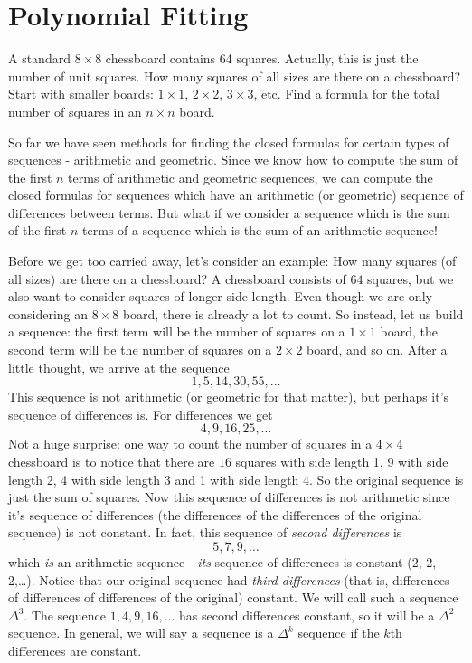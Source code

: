 \documentclass[12pt]{article}
\begin{document}
\section{Polynomial Fitting}

\begin{activity}
A standard $8 \times 8$ chessboard contains 64 squares.  Actually, this is just the number of unit squares.  How many squares of all sizes are there on a chessboard?  Start with smaller boards: $1\times 1$, $2 \times 2$, $3\times 3$, etc.  Find a formula for the total number of squares in an $n\times n$ board.
\end{activity}

So far we have seen methods for finding the closed formulas for certain types of sequences - arithmetic and geometric.  Since we know how to compute the sum of the first $n$ terms of arithmetic and geometric sequences, we can compute the closed formulas for sequences which have an arithmetic (or geometric) sequence of differences between terms.  But what if we consider a sequence which is the sum of the first $n$ terms of a sequence which is the sum of an arithmetic sequence!

Before we get too carried away, let's consider an example: How many squares (of all sizes) are there on a chessboard?  A chessboard consists of $64$ squares, but we also want to consider squares of longer side length.  Even though we are only considering an $8 \times 8$ board, there is already a lot to count.  So instead, let us build a sequence: the first term will be the number of squares on a $1 \times 1$ board, the second term will be the number of squares on a $2 \times 2$ board, and so on.  After a little thought, we arrive at the sequence
\[1,5,14,30, 55,\ldots\]
This sequence is not arithmetic (or geometric for that matter), but perhaps it's sequence of differences is.  For differences we get
\[4, 9, 16, 25, \ldots\]
Not a huge surprise: one way to count the number of squares in a $4 \times 4$ chessboard is to notice that there are $16$ squares with side length 1, 9 with side length 2, 4 with side length 3 and 1 with side length 4.  So the original sequence is just the sum of squares.  Now this sequence of differences is not arithmetic since it's sequence of differences (the differences of the differences of the original sequence) is not constant.  In fact, this sequence of {\em second differences} is
\[5, 7, 9, \ldots\]
which {\em is} an arithmetic sequence - {\em its} sequence of differences is constant (2, 2, 2,\ldots).  Notice that our original sequence had {\em third differences} (that is, differences of differences of differences of the original) constant.  We will call such a sequence $\Delta^3$.  The sequence $1, 4, 9, 16, \ldots$ has second differences constant, so it will be a $\Delta^2$ sequence. In general, we will say a sequence is a $\Delta^k$ sequence if the $k$th differences are constant.
\end{document}
